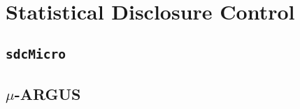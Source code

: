 \section{Statistical Disclosure Control}
\label{State::SDC}

\subsection{\texttt{sdcMicro}}
\label{State::SDC::sdcMicro}

\subsection{$\mu$-ARGUS}
\label{State::SDC::muARGUS}
